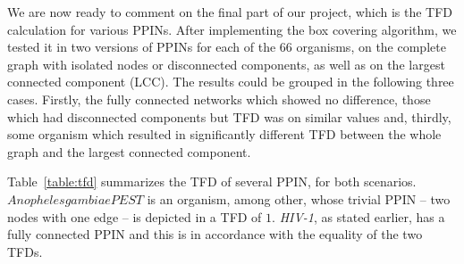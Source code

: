 \label{sec:4-task3}

We are now ready to comment on the final part of our project, which is the TFD calculation for various PPINs. After implementing the box covering algorithm, we tested it in two versions of PPINs for each of the $66$ organisms, on the complete graph with isolated nodes or disconnected components, as well as on the largest connected component (LCC). The results could be grouped in the following three cases. Firstly, the fully connected networks which showed no difference, those which had disconnected components but TFD was on similar values and, thirdly, some organism which resulted in significantly different TFD between the whole graph and the largest connected component. 

Table~\ref{table:tfd} summarizes the TFD of several PPIN, for both scenarios. $Anopheles gambiae PEST$ is an organism, among other, whose trivial PPIN -- two nodes with one edge -- is depicted in a TFD of $1$. \textit{HIV-1}, as stated earlier, has a fully connected PPIN and this is in accordance with the equality of the two TFDs.  



